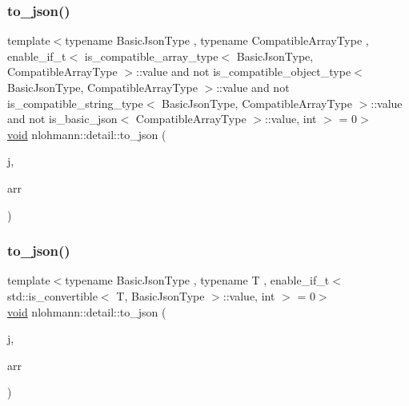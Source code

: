 \subsubsection{\texorpdfstring{to\+\_\+json()}{to\_json()}\hspace{0.1cm}{\footnotesize\ttfamily [9/17]}}
{\footnotesize\ttfamily template$<$typename Basic\+Json\+Type , typename Compatible\+Array\+Type , enable\+\_\+if\+\_\+t$<$ is\+\_\+compatible\+\_\+array\+\_\+type$<$ Basic\+Json\+Type, Compatible\+Array\+Type $>$\+::value and not is\+\_\+compatible\+\_\+object\+\_\+type$<$ Basic\+Json\+Type, Compatible\+Array\+Type $>$\+::value and not is\+\_\+compatible\+\_\+string\+\_\+type$<$ Basic\+Json\+Type, Compatible\+Array\+Type $>$\+::value and not is\+\_\+basic\+\_\+json$<$ Compatible\+Array\+Type $>$\+::value, int $>$  = 0$>$ \\
\hyperlink{namespacenlohmann_1_1detail_a59fca69799f6b9e366710cb9043aa77d}{void} nlohmann\+::detail\+::to\+\_\+json (\begin{DoxyParamCaption}\item[{Basic\+Json\+Type \&}]{j,  }\item[{const Compatible\+Array\+Type \&}]{arr }\end{DoxyParamCaption})}

\mbox{\label{namespacenlohmann_1_1detail_a7f7c7b9760161b774cdc0b4b838fae64}} 
\subsubsection{\texorpdfstring{to\+\_\+json()}{to\_json()}\hspace{0.1cm}{\footnotesize\ttfamily [10/17]}}
{\footnotesize\ttfamily template$<$typename Basic\+Json\+Type , typename T , enable\+\_\+if\+\_\+t$<$ std\+::is\+\_\+convertible$<$ T, Basic\+Json\+Type $>$\+::value, int $>$  = 0$>$ \\
\hyperlink{namespacenlohmann_1_1detail_a59fca69799f6b9e366710cb9043aa77d}{void} nlohmann\+::detail\+::to\+\_\+json (\begin{DoxyParamCaption}\item[{Basic\+Json\+Type \&}]{j,  }\item[{const std\+::valarray$<$ T $>$ \&}]{arr }\end{DoxyParamCaption})}

